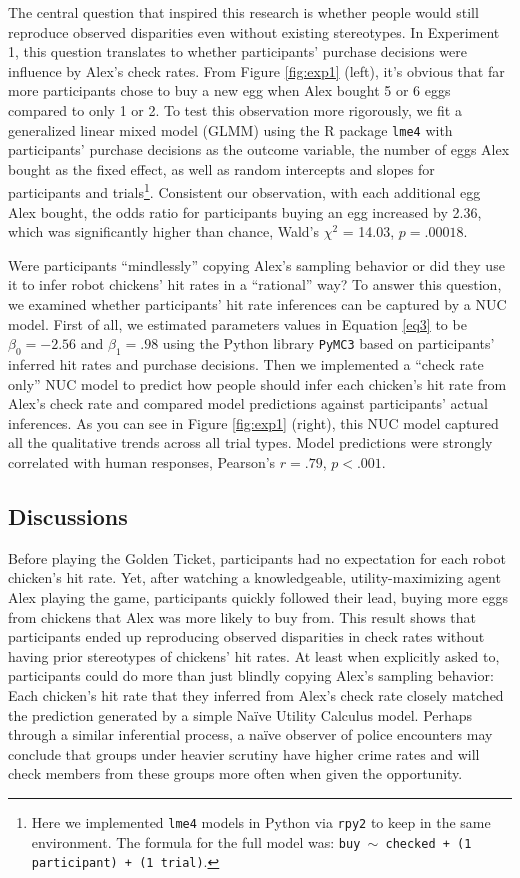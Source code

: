 \documentclass[10pt,letterpaper]{article}
\begin{document}
The central question that inspired this research is whether people would still reproduce observed disparities even without existing stereotypes. In Experiment 1, this question translates to whether participants' purchase decisions were influence by Alex's check rates. From Figure \ref{fig:exp1} (left), it's obvious that far more participants chose to buy a new egg when Alex bought 5 or 6 eggs compared to only 1 or 2. To test this observation more rigorously, we fit a generalized linear mixed model (GLMM) using the R package \texttt{lme4} \citep*{bates2015fitting} with participants' purchase decisions as the outcome variable, the number of eggs Alex bought as the fixed effect, as well as random intercepts and slopes for participants and trials\footnote{Here we implemented \texttt{lme4} models in Python via \texttt{rpy2} to keep in the same environment. The formula for the full model was: \texttt{buy $\sim$ checked + (1 {\textbar} participant) + (1 {\textbar} trial)}.}. Consistent our observation, with each additional egg Alex bought, the odds ratio for participants buying an egg increased by 2.36, which was significantly higher than chance, Wald's $\chi^2$ = 14.03, $p = .00018$. 

Were participants ``mindlessly'' copying Alex's sampling behavior or did they use it to infer robot chickens' hit rates in a ``rational'' way? To answer this question, we examined whether participants' hit rate inferences can be captured by a NUC model. First of all, we estimated parameters values in Equation \ref{eq3} to be $\beta_0 = -2.56$ and $\beta_1 = .98$ using the Python library \texttt{PyMC3} \citep*{salvatier2016probabilistic} based on participants' inferred hit rates and purchase decisions. Then we implemented a ``check rate only'' NUC model to predict how people should infer each chicken's hit rate from Alex's check rate and compared model predictions against participants' actual inferences. As you can see in Figure \ref{fig:exp1} (right), this NUC model captured all the qualitative trends across all trial types. Model predictions were strongly correlated with human responses, Pearson's $r = .79$, $p < .001$. 

\subsection{Discussions} 
Before playing the Golden Ticket, participants had no expectation for each robot chicken's hit rate. Yet, after watching a knowledgeable, utility-maximizing agent Alex playing the game, participants quickly followed their lead, buying more eggs from chickens that Alex was more likely to buy from. This result shows that participants ended up reproducing observed disparities in check rates without having prior stereotypes of chickens' hit rates. At least when explicitly asked to, participants could do more than just blindly copying Alex's sampling behavior: Each chicken's hit rate that they inferred from Alex's check rate closely matched the prediction generated by a simple Na\"ive Utility Calculus model. Perhaps through a similar inferential process, a na\"ive observer of police encounters may conclude that groups under heavier scrutiny have higher crime rates and will check members from these groups more often when given the opportunity.
\end{document}
